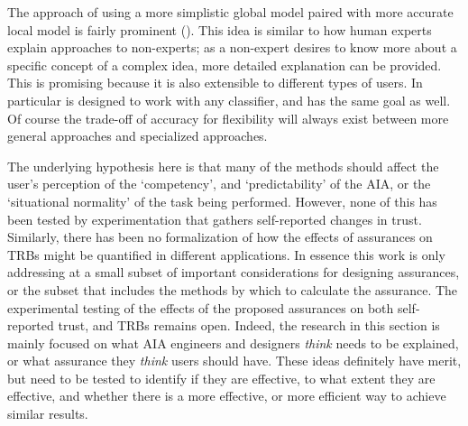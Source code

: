     The approach of using a more simplistic global model paired with more accurate local model is fairly prominent (\cite{Ruping2006-xj,Ribeiro2016-uc,Otte2013-oo}). This idea is similar to how human experts explain approaches to non-experts; as a non-expert desires to know more about a specific concept of a complex idea, more detailed explanation can be provided. This is promising because it is also extensible to different types of users. In particular \cite{Ribeiro2016-uc} is designed to work with any classifier, and \cite{Zhang2014-he} has the same goal as well. Of course the trade-off of accuracy for flexibility will always exist between more general approaches and specialized approaches.

    The underlying hypothesis here is that many of the methods should affect the user's perception of the `competency', and `predictability' of the AIA, or the `situational normality' of the task being performed. However, none of this has been tested by experimentation that gathers self-reported changes in trust. Similarly, there has been no formalization of how the effects of assurances on TRBs might be quantified in different applications. In essence this work is only addressing at a small subset of important considerations for designing assurances, or the subset that includes the methods by which to calculate the assurance. The experimental testing of the effects of the proposed assurances on both self-reported trust, and TRBs remains open. Indeed, the research in this section is mainly focused on what AIA engineers and designers \emph{think} needs to be explained, or what assurance they \emph{think} users should have. These ideas definitely have merit, but need to be tested to identify if they are effective, to what extent they are effective, and whether there is a more effective, or more efficient way to achieve similar results.
